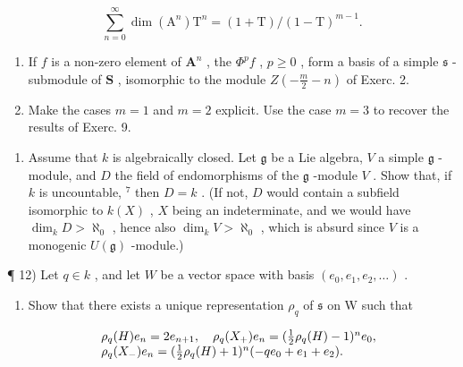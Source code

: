 \[
\sum_ {n = 0} ^ {\infty} \dim (\mathrm{A} ^ {n}) \mathrm{T} ^ {n} = (1 + \mathrm{T}) / (1 - \mathrm{T}) ^ {m - 1}.
\]

\begin{enumerate}
\def\labelenumi{\alph{enumi})}
\setcounter{enumi}{2}
\item
  If \(f\) is a non-zero element of \(\mathbf{A}^n\) , the \(\varPhi^p f\) , \(p \geq 0\) , form a basis of a simple \(\mathfrak{s}\) -submodule of \(\mathbf{S}\) , isomorphic to the module \(Z\left(-\frac{m}{2} - n\right)\) of Exerc. 2.
\item
  Make the cases \(m = 1\) and \(m = 2\) explicit. Use the case \(m = 3\) to recover the results of Exerc. 9.
\end{enumerate}

\begin{enumerate}
\def\labelenumi{\arabic{enumi})}
\setcounter{enumi}{10}
\tightlist
\item
  Assume that \(k\) is algebraically closed. Let \(\mathfrak{g}\) be a Lie algebra, \(V\) a simple \(\mathfrak{g}\) -module, and \(D\) the field of endomorphisms of the \(\mathfrak{g}\) -module \(V\) . Show that, if \(k\) is uncountable, \(^7\) then \(D = k\) . (If not, \(D\) would contain a subfield isomorphic to \(k(X)\) , \(X\) being an indeterminate, and we would have \(\dim_k D > \aleph_0\) , hence also \(\dim_k V > \aleph_0\) , which is absurd since \(V\) is a monogenic \(U(\mathfrak{g})\) -module.)
\end{enumerate}


¶ 12) Let \(q \in k\) , and let \(W\) be a vector space with basis \((e_0, e_1, e_2, \ldots)\) .

\begin{enumerate}
\def\labelenumi{\alph{enumi})}
\tightlist
\item
  Show that there exists a unique representation \(\rho_{q}\) of \(\mathfrak{s}\) on W such that
\end{enumerate}

\[
\begin{array}{r l} & {\rho_ {q} (H) e _ {n} = 2 e _ {n + 1}, \quad \rho_ {q} (X _ {+}) e _ {n} = (\frac {1}{2} \rho_ {q} (H) - 1) ^ {n} e _ {0},} \\ & {\rho_ {q} (X _ {-}) e _ {n} = (\frac {1}{2} \rho_ {q} (H) + 1) ^ {n} (- q e _ {0} + e _ {1} + e _ {2}).} \end{array}
\]

